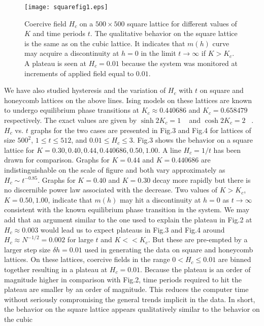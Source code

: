 \documentclass[a4,aps,amsmath,floatfix,nofootinbib,10pt]{revtex4}
\begin{document}
\begin{figure}[hb] 
\texttt{[image: squarefig1.eps]} \caption 
{ Coercive field $H_c$ on a $500 \times 500$ square lattice for 
different values of $K$ and time periods $t$. The qualitative behavior 
on the square lattice is the same as on the cubic lattice. It indicates 
that $m(h)$ curve may acquire a discontinuity at $h=0$ in the limit $t 
\to \infty$ if $K > K_c$. A plateau is seen at $H_c=0.01$ because the 
system was monitored at increments of applied field equal to $0.01$.} 
\label{fig3} \end{figure}


We have also studied hysteresis and the variation of $H_c$ with $t$ on 
square and honeycomb lattices on the above lines. Ising models on these 
lattices are known to undergo equilibrium phase transitions at $K_c 
\approx 0.440686$ and $K_c=0.658479$ respectively. The exact values are 
given by $\sinh{2K_c}=1$ ~\cite{onsager} and $\cosh{2K_c}=2$ 
~\cite{wannier}. $H_c$ vs. $t$ graphs for the two cases are presented 
in Fig.3 and Fig.4 for lattices of size $500^2$, $1 \le t \le 512$, and 
$0.01 \le H_c \le 3$. Fig.3 shows the behavior on a square lattice for 
$K=0.30, 0.40, 0.44, 0.440686, 0.50, 1.00$. A line $H_c=1/t$ has been 
drawn for comparison. Graphs for $K=0.44$ and $K=0.440686$ are 
indistinguishable on the scale of figure and both vary approximately as 
$H_c \sim t^{-0.85}$. Graphs for $K=0.40$ and $K=0.30$ decay more 
rapidly but there is no discernible power law associated with the 
decrease. Two values of $K > K_c$, $K=0.50, 1.00$, indicate that $m(h)$ 
may hit a discontinuity at $h=0$ as $t \to \infty$ consistent with the 
known equilibrium phase transition in the system. We may add that an 
argument similar to the one used to explain the plateau in Fig.2 at 
$H_c \approx 0.003$ would lead us to expect plateaus in Fig.3 and Fig.4 
around $H_c \approx N^{-1/2}=0.002$ for large $t$ and $K << K_c$. But 
these are pre-empted by a larger step size $\delta h=0.01$ used in 
generating the data on square and honeycomb lattices. On these 
lattices, coercive fields in the range $0 < H_c \le 0.01$ are binned 
together resulting in a plateau at $H_c=0.01$. Because the plateau is 
an order of magnitude higher in comparison with Fig.2, time periods 
required to hit the plateau are smaller by an order of magnitude. This 
reduces the computer time without seriously compromising the general 
trends implicit in the data. In short, the behavior on the square 
lattice appears qualitatively similar to the behavior on the cubic 
\end{document}
